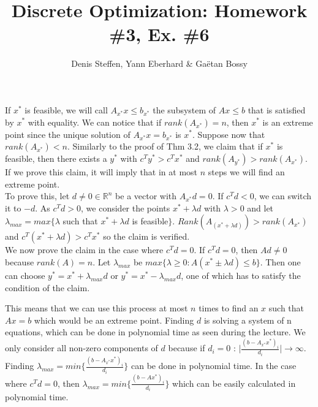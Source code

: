 \documentclass[a4paper,11pt,french]{article}
\title{Discrete Optimization: Homework \#3, Ex. \#6}
\author{Denis Steffen, Yann Eberhard \& Gaëtan Bossy}
\begin{document}
\maketitle
If $x^*$ is feasible, we will call $A_{x^*}x\leq b_{x^*}$ the subsystem of $Ax\leq b$ that is satisfied by $x^*$ with equality. 
We can notice that if $rank(A_{x^*}) = n$, then $x^*$ is an extreme point since the unique solution of $A_{x^*}x = b_{x^*}$ is $x^*$.
Suppose now that $rank(A_{x^*}) < n$. Similarly to the proof of Thm 3.2, we claim that if $x^*$ is feasible, then there exists a $y^*$ with $c^T y^* > c^T x^*$ and $rank(A_{y^*}) > rank(A_{x^*})$. If we prove this claim, it will imply that in at most $n$ steps we will find an extreme point.\\
To prove this, let $d \not= 0 \in \mathbb{R}^n$ be a vector with $A_{x^*}d = 0$. If $c^T d < 0$, we can switch it to $-d$. As $c^T d > 0$, we consider the points $x^* + \lambda d$ with $\lambda> 0$ and let $\lambda_{max}=max\{\lambda$ such that $x^* + \lambda d$ is feasible$\}$. 
$Rank(A_{(x^*+\lambda d)})>rank(A_{x^*})$ and $c^T(x^*+\lambda d)>c^Tx^*$ so the claim is verified. \\
We now prove the claim in the case where $c^T d = 0$. If $c^Td=0$, then $Ad \not= 0$ because $rank(A) = n$. 
Let $\lambda_{max}$ be $max\{\lambda \geq 0: A(x^*\pm\lambda d) \leq b\}$. Then one can choose $y^* = x^* + \lambda_{max}d$ or
$y^* = x^* - \lambda_{max}d$, one of which has to satisfy the condition of the claim. 

This means that we can use this process at most $n$ times to find an $x$ such that $Ax=b$ which would be an extreme point.
Finding $d$ is solving a system of n equations, which can be done in polynomial time as seen during the lecture. 
We only consider all non-zero components of $d$ because if $d_i = 0$ : $\mid\frac{(b-A_{x^*}x^*)_i}{d_i}\mid \longrightarrow \infty$.
Finding $\lambda_{max} = min\{\frac{(b-A_{x^*}x^*)_i}{d_i}\}$ can be done in polynomial time. In the case where $c^Td=0$, then $\lambda_{max}=min\{\frac{(b-Ax^*)_i}{d_i}\}$ which can be easily calculated in polynomial time.
\end{document}
